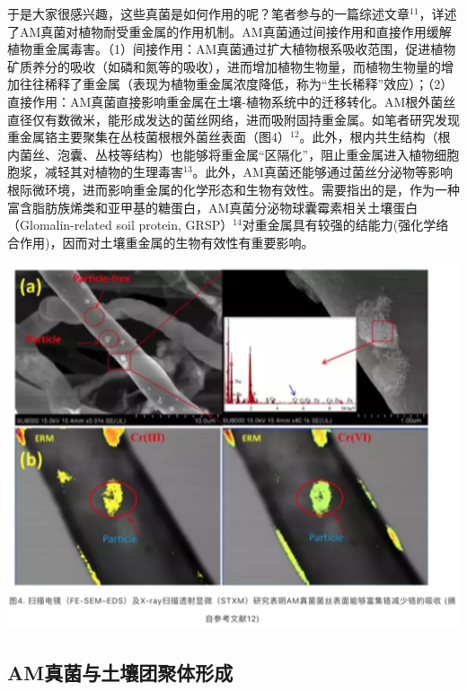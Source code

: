 \documentclass[]{book}
\begin{document}
于是大家很感兴趣，这些真菌是如何作用的呢？笔者参与的一篇综述文章\(^{11}\)，详述了AM真菌对植物耐受重金属的作用机制。AM真菌通过间接作用和直接作用缓解植物重金属毒害。（1）间接作用：AM真菌通过扩大植物根系吸收范围，促进植物矿质养分的吸收（如磷和氮等的吸收），进而增加植物生物量，而植物生物量的增加往往稀释了重金属（表现为植物重金属浓度降低，称为``生长稀释''效应）；（2）直接作用：AM真菌直接影响重金属在土壤-植物系统中的迁移转化。AM根外菌丝直径仅有数微米，能形成发达的菌丝网络，进而吸附固持重金属。如笔者研究发现重金属铬主要聚集在丛枝菌根根外菌丝表面（图4）\(^{12}\)。此外，根内共生结构（根内菌丝、泡囊、丛枝等结构）也能够将重金属``区隔化''，阻止重金属进入植物细胞胞浆，减轻其对植物的生理毒害\(^{13}\)。此外，AM真菌还能够通过菌丝分泌物等影响根际微环境，进而影响重金属的化学形态和生物有效性。需要指出的是，作为一种富含脂肪族烯类和亚甲基的糖蛋白，AM真菌分泌物球囊霉素相关土壤蛋白（Glomalin-related soil protein, GRSP）\(^{14}\)对重金属具有较强的结能力(强化学络合作用)，因而对土壤重金属的生物有效性有重要影响。

\includegraphics[width=6.67in]{images/am4}

\hypertarget{amux771fux83ccux4e0eux571fux58e4ux56e2ux805aux4f53ux5f62ux6210}{%
\subsection{AM真菌与土壤团聚体形成}\label{amux771fux83ccux4e0eux571fux58e4ux56e2ux805aux4f53ux5f62ux6210}}
\end{document}
